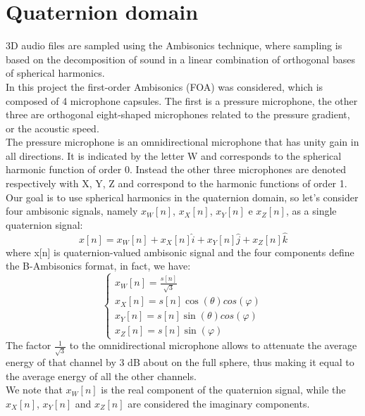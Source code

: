 \documentclass{article}
\begin{document}
    \section{Quaternion domain}
    3D audio files are sampled using the Ambisonics technique, where sampling is based on the decomposition of sound in a linear 
    combination of orthogonal bases of spherical harmonics.
    \\ In this project the first-order Ambisonics (FOA) was considered, which is composed of 4 microphone capsules. The first is
    a pressure microphone, the other three are orthogonal eight-shaped microphones related to the pressure gradient, or the acoustic
    speed.
    \\ The pressure microphone is an omnidirectional microphone that has unity gain in all directions. It is indicated by the letter W 
    and corresponds to the spherical harmonic function of order 0.
    Instead the other three microphones are denoted respectively with X, Y, Z and correspond to the harmonic functions of order 1.
    \\ Our goal is to use spherical harmonics in the quaternion domain, so let's consider four ambisonic signals, namely $x_W[n]$, 
    $x_X[n]$, $x_Y[n]$ e $x_Z[n]$, as a single quaternion signal:
    \begin{equation*}
        x[n]=x_W[n]+x_X[n]\hat{i}+x_Y[n]\hat{j}+x_Z[n]\hat{k}
    \end{equation*}
    where x[n] is quaternion-valued ambisonic signal and the four components define the B-Ambisonics format, in fact, we have:
    \begin{equation*}
        \begin{cases}
            x_W[n] = \frac{s[n]}{\sqrt{3}} \\
            x_X[n] = s[n] \cos(\theta) cos(\varphi) \\
            x_Y[n] = s[n] \sin(\theta) cos(\varphi) \\
            x_Z[n] = s[n] \sin(\varphi)
        \end{cases}
    \end{equation*}
    The factor $\frac{1}{\sqrt{3}}$ to the omnidirectional microphone allows to attenuate the average energy of that channel by 
    3 dB about on the full sphere, thus making it equal to the average energy of all the other channels.
    \\ We note that $x_W[n]$ is the real component of the quaternion signal, while the $x_X[n]$, $x_Y[n]$ and $x_Z[n]$ are 
    considered the imaginary components.
\end{document}
